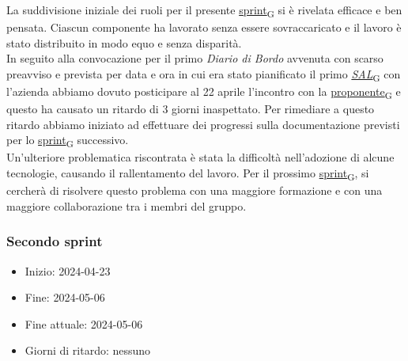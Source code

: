 La suddivisione iniziale dei ruoli per il presente \href{https://7last.github.io/docs/pb/documentazione-interna/glossario\#sprint}{sprint\textsubscript{G}} si è rivelata efficace e ben pensata. Ciascun componente ha lavorato senza essere sovraccaricato e il lavoro è stato distribuito in modo equo e senza disparità. \\
In seguito alla convocazione per il primo \textit{Diario di Bordo} avvenuta con scarso preavviso e prevista per data e ora in cui era stato pianificato il primo \href{https://7last.github.io/docs/pb/documentazione-interna/glossario\#stato-avanzamento-lavori}{\textit{SAL}\textsubscript{G}} con l'azienda abbiamo dovuto posticipare al 22 aprile l'incontro con la \href{https://7last.github.io/docs/pb/documentazione-interna/glossario\#proponente}{proponente\textsubscript{G}} e questo ha causato un ritardo di 3 giorni inaspettato. Per rimediare a questo ritardo abbiamo iniziato ad effettuare dei progressi sulla documentazione previsti per lo \href{https://7last.github.io/docs/pb/documentazione-interna/glossario\#sprint}{sprint\textsubscript{G}} successivo. \\
Un'ulteriore problematica riscontrata è stata la difficoltà nell'adozione di alcune tecnologie, causando il rallentamento del lavoro. Per il prossimo \href{https://7last.github.io/docs/pb/documentazione-interna/glossario\#sprint}{sprint\textsubscript{G}}, si cercherà di risolvere questo problema con una maggiore formazione e con una maggiore collaborazione tra i membri del gruppo.



\newpage
\subsubsection{Secondo sprint}
\begin{itemize}
	\item Inizio: 2024-04-23
	\item Fine: 2024-05-06
	\item Fine attuale: 2024-05-06
	\item Giorni di ritardo: nessuno
\end{itemize}

